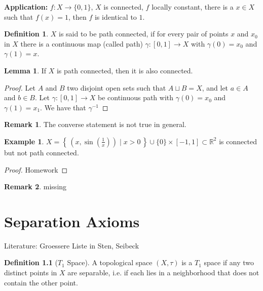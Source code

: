 \documentclass[a4paper]{book}
\theoremstyle{definition}
\newtheorem{definition}{Definition}[chapter]
\newtheorem{example}{Example}[definition]
\newtheorem{lemma}{Lemma}[definition]
\newtheorem*{remark}{Remark}
\newcommand{\makeset}[2]{\left\{\, #1 \mid #2 \,\right\}}
\begin{document}
    \textbf{Application:} \(f: X \longrightarrow \{0, 1\}\), \(X\) is connected, \(f\) locally constant, there is a \(x \in X\) such that \(f(x) = 1\), then \(f\) is identical to \(1\).

    \begin{defbox}
        \begin{definition}
            \(X\) is said to be {\color{maththen}path connected}, if for every pair of points \(x\) and \(x_0\) in \(X\) there is a continuous map (called path) \(\gamma: [0, 1] \longrightarrow X\) with \(\gamma(0) = x_0\) and \(\gamma(1) = x\).
        \end{definition}
    \end{defbox}

    \begin{lemma}
        If \(X\) is path connected, then it is also connected.
    \end{lemma}
    \begin{proof}
        Let \(A\) and \(B\) two disjoint open sets such that \(A \sqcup B = X\), and let \(a \in A\) and \(b \in B\). Let \(\gamma: [0, 1] \longrightarrow X\) be continuous path with \(\gamma(0) = x_0\) and \(\gamma(1) = x_1\). We have that \(\gamma^{-1}\)
    \end{proof}

    \begin{remark}
        The converse statement is not true in general.
    \end{remark}

    \begin{example}
        \(X = \makeset{(x, \sin(\frac{1}{x}))}{x > 0} \cup \{0\} \times [-1, 1] \subset \mathbb{R}^2\) is connected but not path connected.
    \end{example}
    \begin{proof}
        Homework
    \end{proof}
    \begin{remark}
        missing
    \end{remark}

\chapter{Separation Axioms}
Literature: Groessere Liste in Sten, Seibeck

\begin{defbox}
    \begin{definition}[\(T_1\) Space]
        A {\color{mathobj}topological space} \((X, \tau)\) is a \(T_1\) space if any two distinct points in \(X\) are separable, i.e. if each lies in a neighborhood that does not contain the other point.
    \end{definition}
\end{defbox}
\end{document}
